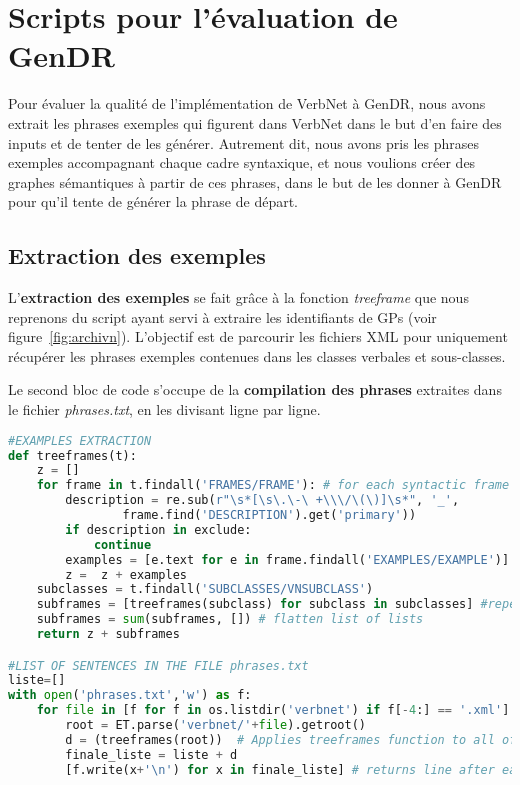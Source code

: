 \section{Scripts pour l'évaluation de GenDR}

Pour évaluer la qualité de l'implémentation de VerbNet à GenDR, nous avons extrait les phrases exemples qui figurent dans VerbNet dans le but d'en faire des inputs et de tenter de les générer. Autrement dit, nous avons pris les phrases exemples accompagnant chaque cadre syntaxique, et nous voulions créer des graphes sémantiques à partir de ces phrases, dans le but de les donner à GenDR pour qu'il tente de générer la phrase de départ.

\subsection{Extraction des exemples}

L'\textbf{extraction des exemples} se fait grâce à la fonction \emph{treeframe} que nous reprenons du script ayant servi à extraire les identifiants de \acp{GP} (voir figure~\ref{fig:archivn}). L'objectif est de parcourir les fichiers XML pour uniquement récupérer les phrases exemples contenues dans les classes verbales et sous-classes.

Le second bloc de code s'occupe de la \textbf{compilation des phrases} extraites dans le fichier \emph{phrases.txt}, en les divisant ligne par ligne. 

\begin{lstlisting}[language=Python, caption = Extraction des phrases exemples de VerbNet]
#EXAMPLES EXTRACTION
def treeframes(t):
    z = []
    for frame in t.findall('FRAMES/FRAME'): # for each syntactic frame
        description = re.sub(r"\s*[\s\.\-\ +\\\/\(\)]\s*", '_',
				frame.find('DESCRIPTION').get('primary'))
        if description in exclude:
            continue    
        examples = [e.text for e in frame.findall('EXAMPLES/EXAMPLE')] # get the examples
        z =  z + examples 
    subclasses = t.findall('SUBCLASSES/VNSUBCLASS')
    subframes = [treeframes(subclass) for subclass in subclasses] #repeat operation for subclasses
    subframes = sum(subframes, []) # flatten list of lists
    return z + subframes

#LIST OF SENTENCES IN THE FILE phrases.txt
liste=[]
with open('phrases.txt','w') as f:
    for file in [f for f in os.listdir('verbnet') if f[-4:] == '.xml']:
        root = ET.parse('verbnet/'+file).getroot()       
        d = (treeframes(root))  # Applies treeframes function to all of VerbNet files
        finale_liste = liste + d
        [f.write(x+'\n') for x in finale_liste] # returns line after each example

\end{lstlisting}

